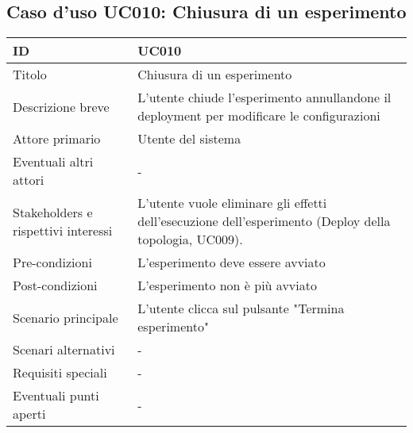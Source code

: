 \documentclass[../../main.tex]{subfiles}
\begin{document}
\subsection{Caso d’uso UC010: Chiusura di un esperimento }
\begin{tabularx}{150mm}{|l|X|}
    \hline
    ID                                  & \textbf{UC010}\\
    \hline
    Titolo                              & Chiusura di un esperimento \\
    \hline
    Descrizione breve                   & L'utente chiude l'esperimento annullandone il deployment per modificare le configurazioni \\ 
    \hline
    Attore primario                     & Utente del sistema   \\
    \hline
    Eventuali altri attori              & -   \\
    \hline
    Stakeholders e rispettivi interessi & L'utente vuole eliminare gli effetti dell'esecuzione dell'esperimento (Deploy della topologia, UC009). \\
    \hline
    Pre-condizioni                      & L'esperimento deve essere avviato   \\
    \hline
    Post-condizioni                     & L'esperimento non è più avviato   \\
    \hline
    Scenario principale                 & L'utente clicca sul pulsante "Termina esperimento"   \\
    \hline
    Scenari alternativi                 & -  \\
    \hline
    Requisiti speciali                  & -   \\
    \hline
    Eventuali punti aperti              & -   \\
    \hline
\end{tabularx}
\vfill\newpage
\end{document}
